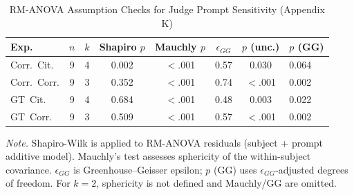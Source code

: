 \begin{table}[H]
\centering
\caption{RM-ANOVA Assumption Checks for Judge Prompt Sensitivity (Appendix K)}
\label{tab:prompt_sensitivity_assumptions}
\begin{threeparttable}
\scriptsize
\setlength{\tabcolsep}{3pt}
\renewcommand{\arraystretch}{1.1}
\begin{tabular}{lccccccl}
\toprule
\textbf{Exp.} & \textbf{$n$} & \textbf{$k$} & \textbf{Shapiro $p$} & \textbf{Mauchly $p$} & \textbf{$\epsilon_{GG}$} & \textbf{$p$ (unc.)} & \textbf{$p$ (GG)} \\
\midrule
Corr.\ Cit. & 9 & 4 & 0.002 & $<$.001 & 0.57 & 0.030 & 0.064 \\
Corr.\ Corr. & 9 & 3 & 0.352 & $<$.001 & 0.74 & $<$.001 & 0.002 \\
GT\ Cit. & 9 & 4 & 0.684 & $<$.001 & 0.48 & 0.003 & 0.022 \\
GT\ Corr. & 9 & 3 & 0.509 & $<$.001 & 0.57 & $<$.001 & 0.002 \\
\bottomrule
\end{tabular}
\begin{tablenotes}
\scriptsize
\item \textit{Note.} Shapiro-Wilk is applied to RM-ANOVA residuals (subject + prompt additive model). Mauchly's test assesses sphericity of the within-subject covariance. $\epsilon_{GG}$ is Greenhouse--Geisser epsilon; $p$ (GG) uses $\epsilon_{GG}$-adjusted degrees of freedom. For $k=2$, sphericity is not defined and Mauchly/GG are omitted.
\end{tablenotes}
\end{threeparttable}
\end{table}